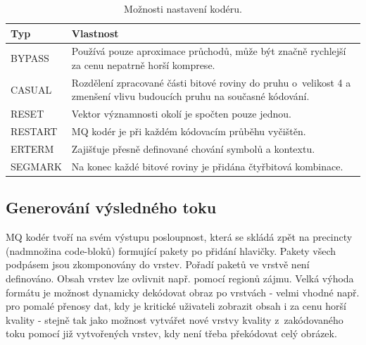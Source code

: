 \begin{table}[ht!]
  \centering
    \setlength{\tabcolsep}{3pt} %
    \renewcommand{\arraystretch}{1.15} %

    \begin{tabular}{|p{3cm}|p{11.5cm}|}
      \hline
      \textbf{Typ} & \textbf{Vlastnost} \\ 
      \hline

      BYPASS & Používá pouze aproximace průchodů, může být značně rychlejší za cenu nepatrně horší komprese.\\ 
      CASUAL & Rozdělení zpracované části bitové roviny do pruhu o~velikost 4 a zmenšení vlivu budoucích pruhu na současné kódování.\\
      RESET & Vektor významnosti okolí je spočten pouze jednou.  \\ 
      RESTART & MQ kodér je při každém kódovacím průběhu vyčištěn. \\ 
      ERTERM & Zajišťuje přesně definované chování symbolů a kontextu. \\ 
      SEGMARK & Na konec každé bitové roviny je přidána čtyřbitová kombinace. \\
      \hline
    \end{tabular}
    \caption{Možnosti nastavení kodéru.} 
\end{table}


\subsection*{Generování výsledného toku}
MQ kodér tvoří na svém výstupu posloupnost, která se skládá zpět na precincty (nadmnožina code-bloků) formující pakety po přidání hlavičky. Pakety všech podpásem jsou zkomponovány do vrstev. Pořadí paketů ve vrstvě není definováno. Obsah vrstev lze ovlivnit např. pomocí regionů zájmu. Velká výhoda formátu je možnost dynamicky dekódovat obraz po vrstvách - velmi vhodné např. pro pomalé přenosy dat, kdy je kritické uživateli zobrazit obsah i za cenu horší kvality - stejně tak jako možnost vytvářet nové vrstvy kvality z~zakódovaného toku pomocí již vytvořených vrstev, kdy není třeba překódovat celý obrázek.


